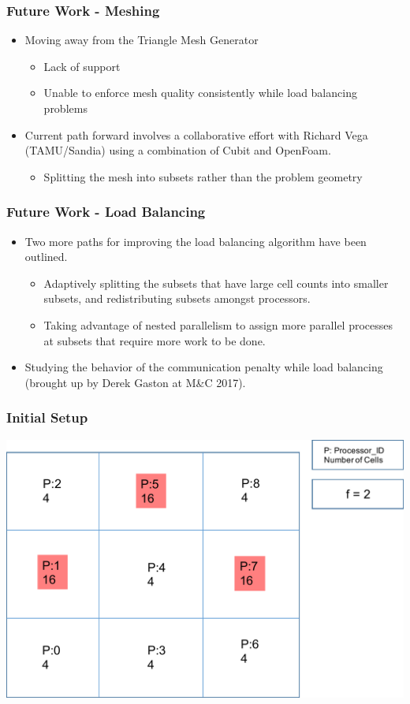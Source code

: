 \documentclass[compress]{beamer}
\begin{document}
\begin{frame}[t]\frametitle{Future Work - Meshing}
\begin{block}{}
\begin{itemize}
\item Moving away from the Triangle Mesh Generator
	\begin{itemize}
		\item Lack of support
		\item Unable to enforce mesh quality consistently while load balancing problems
	\end{itemize}
\item Current path forward involves a collaborative effort with Richard Vega (TAMU/Sandia) using a combination of Cubit and OpenFoam.
	\begin{itemize}
		\item Splitting the mesh into subsets rather than the problem geometry
	\end{itemize}
\end{itemize}
\end{block}
\end{frame}

\begin{frame}[t]\frametitle{Future Work - Load Balancing}
\begin{block}{}
\begin{itemize}
\item Two more paths for improving the load balancing algorithm have been outlined.
\begin{itemize} 
\item Adaptively splitting the subsets that have large cell counts into smaller subsets, and redistributing subsets amongst processors.
\item Taking advantage of nested parallelism to assign more parallel processes at subsets that require more work to be done.
\end{itemize}
\item Studying the behavior of the communication penalty while load balancing (brought up by Derek Gaston at M\&C 2017).
\end{itemize}
\end{block}
\end{frame}

\begin{frame}[t]\frametitle{Initial Setup}
\centering
\includegraphics[scale=0.5]{figures/initial_setup.pdf}
\end{frame}
\end{document}
